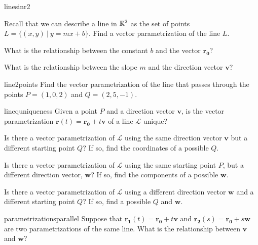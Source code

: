 \begin{problem}{linesinr2}
    
    Recall that we can describe a line in $\mathbb{R}^2$ as the set of points $L = \{(x,y) \ | \ y = mx + b\}$.  Find a vector parametrization of the line $L$.
    
    \begin{subproblems}
    \item What is the relationship between the constant $b$ and the vector $\bm{r_0}$?
    \item What is the relationship between the slope $m$ and the direction vector $\bm{v}$?
    \end{subproblems}
    
\end{problem}

\begin{problem}{line2points}
    Find the vector parametrization of the line that passes through the points $P = (1,0,2)$ and $Q = (2,5,-1)$.
\end{problem}

\begin{problem}{linequniqueness}
    Given a point $P$ and a direction vector $\bm{v}$, is the vector parametrization $\bm{r}(t) = \bm{r_0} + t\bm{v}$ of a line $\mathscr{L}$ unique? 
    
    \begin{subproblems}
    \item Is there a vector parametrization of $\mathscr{L}$ using the same direction vector $\bm{v}$ but a different starting point $Q$?  If so, find the coordinates of a possible $Q$.
    \item Is there a vector parametrization of $\mathscr{L}$ using the same starting point $P$, but a different direction vector, $\bm{w}$?  If so, find the components of a possible $\bm{w}$.
    \item Is there a vector parametrization of $\mathscr{L}$ using a different direction vector $\bm{w}$ and a different starting point $Q$?  If so, find a possible $Q$ and $\bm{w}$.
    \end{subproblems}

    
\end{problem}

\begin{problem}{parametrizationsparallel}
    Suppose that $\bm{r_1}(t) = \bm{r_0} + t\bm{v}$ and $\bm{r_2}(s) = \bm{r_0} + s\bm{w}$ are two parametrizations of the same line.  What is the relationship between $\bm{v}$ and $\bm{w}$?
\end{problem}

